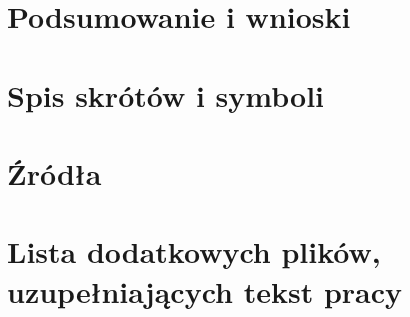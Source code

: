 \documentclass[a4paper,twoside,12pt]{book}
\begin{document}
\chapter{Podsumowanie i wnioski}



\backmatter
\printbibliography           %

\begin{appendices}

\chapter{Spis skrótów i symboli}


\chapter{Źródła}


\chapter{Lista dodatkowych plików, uzupełniających tekst pracy} 


\listoffigures
{}
\listoftables
{}

\end{appendices}
\end{document}
